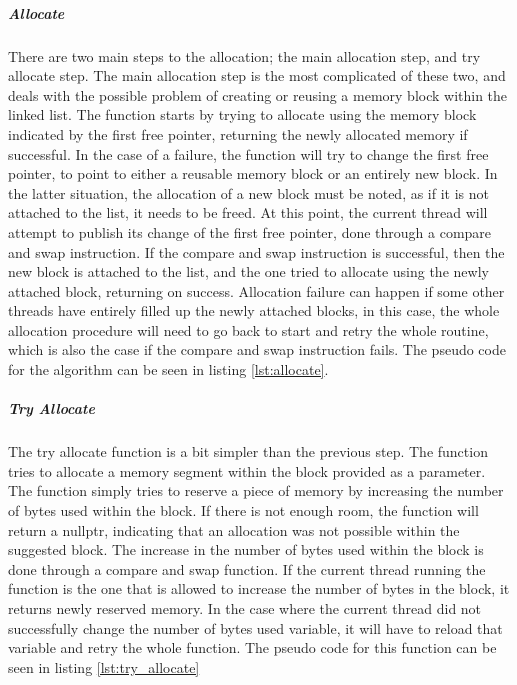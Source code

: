 \subparagraph{Allocate}
There are two main steps to the allocation; the main allocation step, and try allocate step.
The main allocation step is the most complicated of these two, and deals with the possible problem of creating or reusing a memory block within the linked list.
The function starts by trying to allocate using the memory block indicated by the first free pointer, returning the newly allocated memory if successful.
In the case of a failure, the function will try to change the first free pointer, to point to either a reusable memory block or an entirely new block.
In the latter situation, the allocation of a new block must be noted, as if it is not attached to the list, it needs to be freed.
At this point, the current thread will attempt to publish its change of the first free pointer, done through a compare and swap instruction.
If the compare and swap instruction is successful, then the new block is attached to the list, and the one tried to allocate using the newly attached block, returning on success.
Allocation failure can happen if some other threads have entirely filled up the newly attached blocks, in this case, the whole allocation procedure will need to go back to start and retry the whole routine, which is also the case if the compare and swap instruction fails.
The pseudo code for the algorithm can be seen in listing \ref{lst:allocate}.


\subparagraph{Try Allocate}
The try allocate function is a bit simpler than the previous step. The function tries to allocate
a memory segment within the block provided as a parameter.
The function simply tries to reserve a piece of memory by increasing the number of bytes used within the block.
If there is not enough room, the function will return a nullptr, indicating that an allocation was not possible within the suggested block.
The increase in the number of bytes used within the block is done through a compare and swap function.
If the current thread running the function is the one that is allowed to increase the number of bytes in the block, it returns newly reserved memory.
In the case where the current thread did not successfully change the number of bytes used variable, it will have to reload that variable and retry the whole function.
The pseudo code for this function can be seen in listing \ref{lst:try_allocate}


